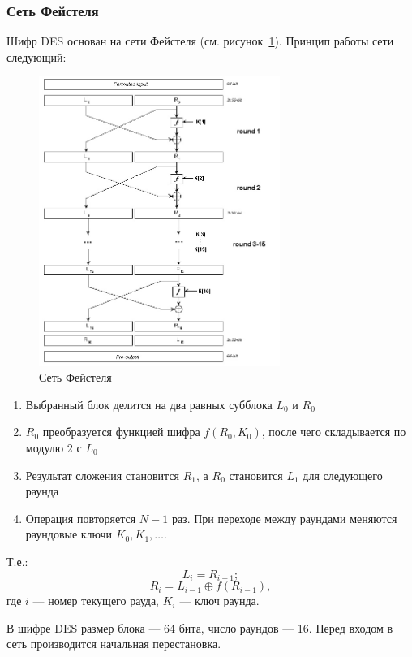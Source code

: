 \documentclass[a4paper, 14pt]{extarticle}
\begin{document}
\subsubsection{Сеть Фейстеля}
Шифр DES основан на сети Фейстеля (см. рисунок~\ref{img:1:1}). Принцип работы сети следующий:

\begin{figure}[h]
    \centering
    \includegraphics[width=0.7\textwidth]{./img/S001.jpg}
    \caption{Сеть Фейстеля}%
    \label{img:1:1}
\end{figure}

\begin{enumerate}
    \item Выбранный блок делится на два равных субблока $L_0$ и $R_0$
    \item $R_0$ преобразуется функцией шифра $f(R_0, K_0)$, после чего складывается по модулю 2 с $L_0$
    \item Результат сложения становится $R_1$, а $R_0$ становится $L_1$ для следующего раунда
    \item Операция повторяется $N-1$ раз. При переходе между раундами меняются раундовые ключи $K_0, K_1, \ldots $.\\
\end{enumerate}
Т.е.:
\[ L_i = R_{i-1}; \]
\[ R_i = L_{i-1} \oplus f(R_{i-1}), \]
где $i$ --- номер текущего рауда, $K_i$ --- ключ раунда.

В шифре DES размер блока --- 64 бита, число раундов --- 16. Перед входом в сеть производится начальная перестановка.
\end{document}
